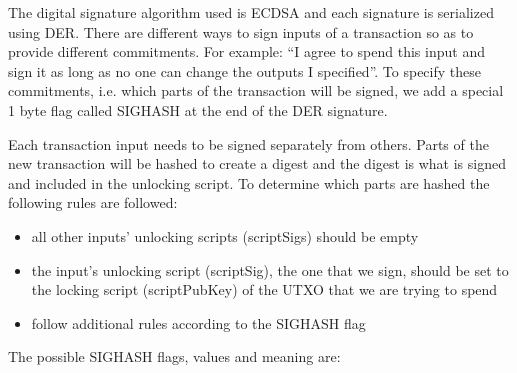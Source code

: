 The digital signature algorithm used is ECDSA and each signature is serialized using DER. There are different ways to sign inputs of a transaction so as to provide different commitments. For example: ``I agree to spend this input and sign it as long as no one can change the outputs I specified''. To specify these commitments, i.e. which parts of the transaction will be signed, we add a special 1 byte flag called SIGHASH at the end of the DER signature.

Each transaction input needs to be signed separately from others. Parts of the new transaction will be hashed to create a digest and the digest is what is signed and included in the unlocking script. To determine which parts are hashed the following rules are followed:

\begin{itemize}
\item all other inputs’ unlocking scripts (scriptSigs) should be empty
\item the input’s unlocking script (scriptSig), the one that we sign, should be set to the locking script (scriptPubKey) of the UTXO that we are trying to spend
\item follow additional rules according to the SIGHASH flag
\end{itemize}

The possible SIGHASH flags, values and meaning are:

